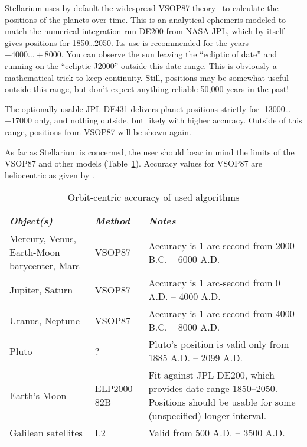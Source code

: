 Stellarium uses by default the widespread VSOP87 theory~\citep{1988A&A...202..309B} %
to calculate the positions of the planets over time.
This is an analytical ephemeris modeled to match the numerical
integration run DE200 from NASA JPL, which by itself gives positions for 1850\ldots2050. 
Its use is recommended for the years $-4000\ldots+8000$. You can observe the sun leaving the ``ecliptic
of date'' and running on the ``ecliptic J2000'' outside this date
range. This is obviously a mathematical trick to keep
continuity. Still, positions may be somewhat useful outside this
range, but don't expect anything reliable 50,000 years in the past! 

The optionally usable JPL DE431 delivers planet positions strictly for
-13000\ldots+17000 only, and nothing outside, but likely with higher accuracy. 
Outside of this range, positions from VSOP87 will be shown again.

As far as Stellarium is concerned, the user should bear in mind the
limits of the VSOP87 and other models (Table~\ref{tab:Accuracy:Planets}).
Accuracy values for VSOP87 are heliocentric as given by \citet{1988A&A...202..309B}.

\begin{table}[tb]
\begin{tabularx}{\textwidth}{X|l|X}
\toprule
\emph{Object(s)} & \emph{Method} & \emph{Notes}\tabularnewline
\midrule
Mercury, Venus, Earth-Moon barycenter, Mars & VSOP87 & Accuracy is 1 arc-second from 2000 B.C. -- 6000 A.D. \\%
Jupiter, Saturn                             & VSOP87 & Accuracy is 1 arc-second from 0 A.D. -- 4000 A.D.    \\%
Uranus, Neptune                             & VSOP87 & Accuracy is 1 arc-second from 4000 B.C. -- 8000 A.D. \\%
Pluto                                       & ?      & Pluto's position is valid only from 1885 A.D. -- 2099 A.D.\\%
Earth's Moon                                & ELP2000-82B & Fit against JPL DE200, which provides date range 1850--2050. 
                                                            Positions should be usable for some (unspecified) longer interval. \\%
Galilean satellites                         & L2     & Valid from 500 A.D. -- 3500 A.D.\\ 
\bottomrule
\end{tabularx}
\caption{Orbit-centric accuracy of used algorithms}
\label{tab:Accuracy:Planets}
\end{table}

